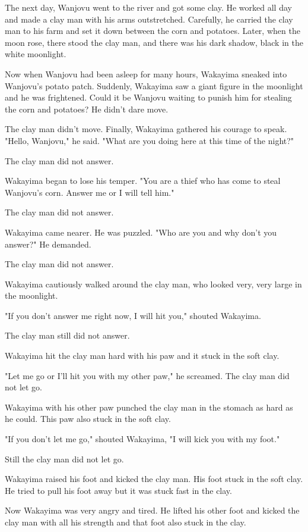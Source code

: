 The next day, Wanjovu went to the river and got some clay. He worked all day and made a clay man with his arms outstretched. Carefully, he carried the clay man to his farm and set it down between the corn and potatoes. Later, when the moon rose, there stood the clay man, and there was his dark shadow, black in the white moonlight.

Now when Wanjovu had been asleep for many hours, Wakayima sneaked into Wanjovu's potato patch. Suddenly, Wakayima saw a giant figure in the moonlight and he was frightened. Could it be Wanjovu waiting to punish him for stealing the corn and potatoes? He didn't dare move.

The clay man didn't move. Finally, Wakayima gathered his courage to speak. "Hello, Wanjovu," he said. "What are you doing here at this time of the night?"

The clay man did not answer.

Wakayima began to lose his temper. "You are a thief who has come to steal Wanjovu's corn. Answer me or I will tell him."

The clay man did not answer.

Wakayima came nearer. He was puzzled. "Who are you and why don't you answer?" He demanded.

The clay man did not answer.

Wakayima cautiously walked around the clay man, who looked very, very large in the moonlight.

"If you don't answer me right now, I will hit you," shouted Wakayima.

The clay man still did not answer.

Wakayima hit the clay man hard with his paw and it stuck in the soft clay.

"Let me go or I'll hit you with my other paw," he screamed. The clay man did not let go.

Wakayima with his other paw punched the clay man in the stomach as hard as he could. This paw also stuck in the soft clay.

"If you don't let me go," shouted Wakayima, "I will kick you with my foot."

Still the clay man did not let go.

Wakayima raised his foot and kicked the clay man. His foot stuck in the soft clay. He tried to pull his foot away but it was stuck fast in the clay.

Now Wakayima was very angry and tired. He lifted his other foot and kicked the clay man with all his strength and that foot also stuck in the clay.

